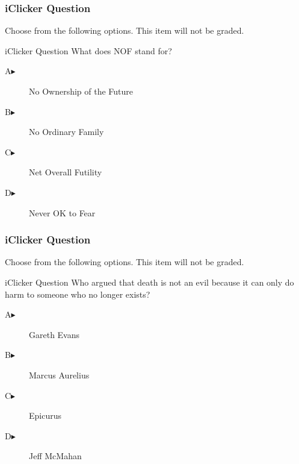 \documentclass[xcolor=dvipsnames]{beamer}
\begin{document}
\begin{frame}
  \frametitle{iClicker Question}
Choose from the following options. This item will not be graded.
\begin{block}{iClicker Question}
What does NOF stand for?
\end{block}
\begin{description}
\item[A\hspace{.2in}$\blacktriangleright$] No Ownership of the Future
\item[B\hspace{.2in}$\blacktriangleright$] No Ordinary Family
\item[C\hspace{.2in}$\blacktriangleright$] Net Overall Futility
\item[D\hspace{.2in}$\blacktriangleright$] Never OK to Fear
\end{description}
\end{frame}

\begin{frame}
  \frametitle{iClicker Question}
Choose from the following options. This item will not be graded.
\begin{block}{iClicker Question}
Who argued that death is not an evil because it can only do harm to
someone who no longer exists?
\end{block}
\begin{description}
\item[A\hspace{.2in}$\blacktriangleright$] Gareth Evans
\item[B\hspace{.2in}$\blacktriangleright$] Marcus Aurelius
\item[C\hspace{.2in}$\blacktriangleright$] Epicurus
\item[D\hspace{.2in}$\blacktriangleright$] Jeff McMahan
\end{description}
\end{frame}
\end{document}
